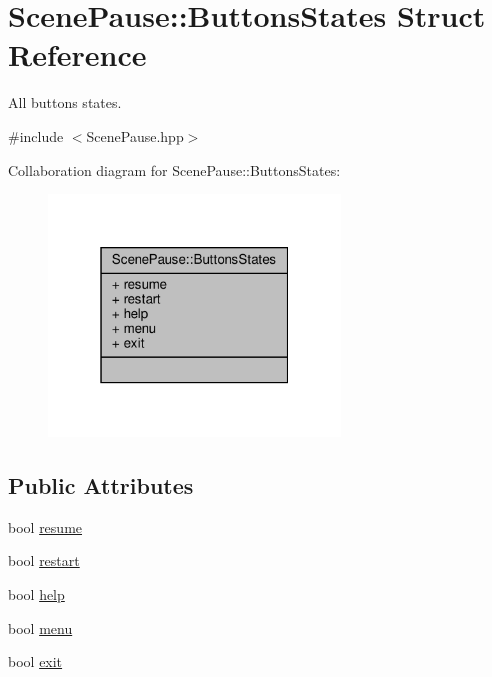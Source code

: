 \hypertarget{struct_scene_pause_1_1_buttons_states}{}\section{Scene\+Pause\+:\+:Buttons\+States Struct Reference}
\label{struct_scene_pause_1_1_buttons_states}


All buttons states.  




{\ttfamily \#include $<$Scene\+Pause.\+hpp$>$}



Collaboration diagram for Scene\+Pause\+:\+:Buttons\+States\+:
\nopagebreak
\begin{figure}[H]
\begin{center}
\leavevmode
\includegraphics[width=220pt]{struct_scene_pause_1_1_buttons_states__coll__graph}
\end{center}
\end{figure}
\subsection*{Public Attributes}
\begin{DoxyCompactItemize}
\item 
bool \hyperlink{struct_scene_pause_1_1_buttons_states_a59b513318486097a19f02f4028aa3fe8}{resume}
\item 
bool \hyperlink{struct_scene_pause_1_1_buttons_states_a34df4897a0189b1e07f2ac4391081e62}{restart}
\item 
bool \hyperlink{struct_scene_pause_1_1_buttons_states_aa61a79ff606be18223d834445c08ea8e}{help}
\item 
bool \hyperlink{struct_scene_pause_1_1_buttons_states_a507c26169d7ecbe5bd048790044c5e21}{menu}
\item 
bool \hyperlink{struct_scene_pause_1_1_buttons_states_af36a05e31bbdb2c9bfc29b81ea196d2f}{exit}
\end{DoxyCompactItemize}



